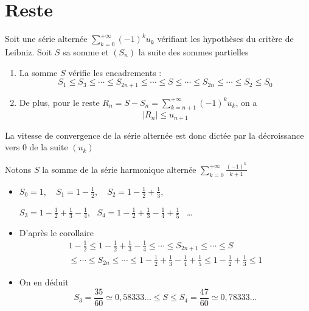 \section{Reste}

\begin{frame}

\begin{corollaire}
Soit une série alternée $\displaystyle \sum_{k=0}^{+\infty} (-1)^k u_k$ vérifiant 
les hypothèses du critère de Leibniz. \pause
Soit $S$ sa somme et $(S_n)$ la suite des sommes partielles
\begin{enumerate}
  \item\pause La somme $S$ vérifie les encadrements :
  $$ S_1\le S_3\le \cdots \le S_{2n+1} \le \cdots \le S 
  \le  \cdots\le S_{2n} \le \cdots\le S_2\le S_0$$
  \item\pause De plus, pour le reste $\displaystyle R_n=S-S_n =\sum_{k=n+1}^{+\infty} (-1)^k u_k$, on  a
$$\big|R_n\big|\le u_{n+1}$$  
\end{enumerate}
\end{corollaire}

\pause
La vitesse de convergence de la série alternée est donc
dictée par la décroissance vers $0$ de la suite $(u_k)$
\end{frame}

\begin{frame}
\begin{exemple}
Notons $S$ la somme de la série harmonique alternée 
$\displaystyle\sum_{k=0}^{+\infty} \frac{(-1)^{k}}{k+1}$
\begin{itemize}
  \item\pause
$S_0 = 1$, \ \pause
$S_1 = 1-\frac{1}{2}$, \ \pause
$S_2 = 1-\frac{1}{2}+\frac{1}{3}$, \pause

$S_3 = 1-\frac{1}{2}+\frac{1}{3}-\frac{1}{4}$, \
$S_4 = 1-\frac{1}{2}+\frac{1}{3}-\frac{1}{4}+\frac{1}{5}$ \ \ldots

\item\pause D'après le corollaire
\begin{multline*}
1-\frac{1}{2} \le 1-\frac{1}{2}+\frac{1}{3}-\frac{1}{4} \le \cdots \le S_{2n+1} \le \cdots \le S \\
  \le  \cdots\le S_{2n} \le \cdots 
  \le 1-\frac{1}{2}+\frac{1}{3}-\frac{1}{4}+\frac{1}{5}
  \le 1-\frac{1}{2}+\frac{1}{3} \le 1
\end{multline*}
\item\pause On en déduit 
$$S_3 = \frac{35}{60} \simeq 0,58333\ldots \le S \le S_4 = \frac{47}{60} \simeq 0,78333\ldots$$
\end{itemize}
\end{exemple}
\end{frame}

